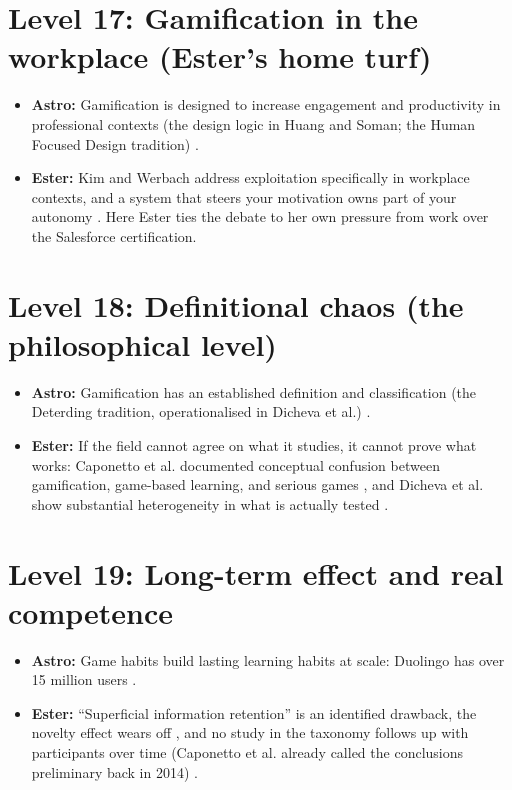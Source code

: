 \documentclass{article}
\begin{document}
\section{Level 17: Gamification in the workplace (Ester's home turf)}
\begin{itemize}
  \item \textbf{Astro:} Gamification is designed to increase engagement and productivity in professional contexts (the design logic in Huang and Soman; the Human Focused Design tradition) \cite{huang2013}.
  \item \textbf{Ester:} Kim and Werbach address exploitation specifically in workplace contexts, and a system that steers your motivation owns part of your autonomy \cite{kim2016}. Here Ester ties the debate to her own pressure from work over the Salesforce certification.
\end{itemize}

\section{Level 18: Definitional chaos (the philosophical level)}
\begin{itemize}
  \item \textbf{Astro:} Gamification has an established definition and classification (the Deterding tradition, operationalised in Dicheva et al.) \cite{dicheva2015}.
  \item \textbf{Ester:} If the field cannot agree on what it studies, it cannot prove what works: Caponetto et al. documented conceptual confusion between gamification, game-based learning, and serious games \cite{caponetto2014}, and Dicheva et al. show substantial heterogeneity in what is actually tested \cite{dicheva2015}.
\end{itemize}

\section{Level 19: Long-term effect and real competence}
\begin{itemize}
  \item \textbf{Astro:} Game habits build lasting learning habits at scale: Duolingo has over 15 million users \cite{biryukov2021}.
  \item \textbf{Ester:} ``Superficial information retention'' is an identified drawback, the novelty effect wears off \cite{mirzaiefeizabadi2022}, and no study in the taxonomy follows up with participants over time (Caponetto et al. already called the conclusions preliminary back in 2014) \cite{caponetto2014}.
\end{itemize}
\end{document}
